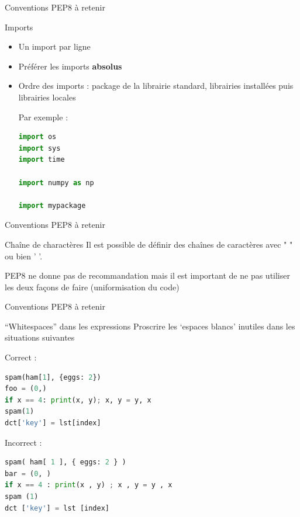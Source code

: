 \documentclass[10pt]{beamer}
\begin{document}
\begin{frame}[fragile]{Conventions PEP8 à retenir}
  \begin{block}{Imports}
    \medskip
    \begin{itemize}
      \item Un import par ligne
      \item Préférer les imports \textbf{absolus}
      \item Ordre des imports : package de la librairie standard, librairies installées puis librairies locales

Par exemple :
\begin{lstlisting}[language=python, numbers=none]
import os
import sys
import time

import numpy as np

import mypackage
\end{lstlisting}
    \end{itemize}
  \end{block}
\end{frame}



\begin{frame}[fragile]{Conventions PEP8 à retenir}
  \begin{block}{Chaîne de charactères}
    \medskip
    Il est possible de définir des chaînes de caractères avec " " ou bien ' '.

    PEP8 ne donne pas de recommandation mais il est important de ne pas utiliser les deux façons de faire (uniformisation du code)
  \end{block}
\end{frame}



\begin{frame}[fragile]{Conventions PEP8 à retenir}
  \begin{block}{``Whitespaces'' dans les expressions}
    \medskip
    Proscrire les `espaces blancs' inutiles dans les situations suivantes
  \end{block}

  Correct :
\begin{lstlisting}[language=python, numbers=none]
spam(ham[1], {eggs: 2})
foo = (0,)
if x == 4: print(x, y); x, y = y, x
spam(1)
dct['key'] = lst[index]
\end{lstlisting}

Incorrect :
\begin{lstlisting}[language=python, numbers=none]
spam( ham[ 1 ], { eggs: 2 } )
bar = (0, )
if x == 4 : print(x , y) ; x , y = y , x
spam (1)
dct ['key'] = lst [index]
\end{lstlisting}
\end{frame}
\end{document}

